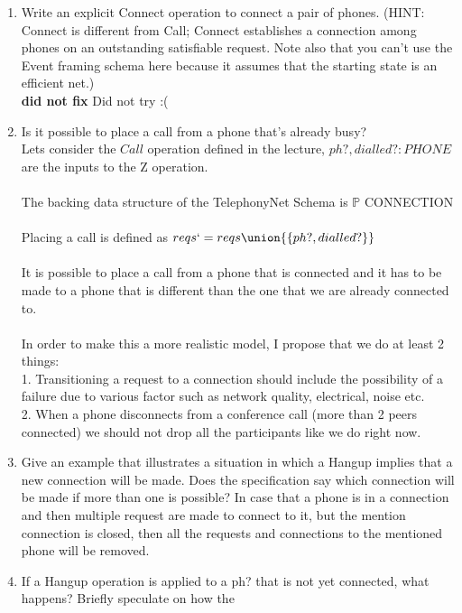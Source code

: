\documentclass{article}
\begin{document}
\begin{enumerate}
\begin{enumerate}
\item Write an explicit Connect operation to connect a pair of
phones. (HINT: Connect is different from Call; Connect establishes
a connection among phones on an outstanding satisfiable request. Note also that you can't use the Event framing schema here because it assumes that the starting state is an efficient net.) \\
\color{blue}
 \textbf{did not fix}
Did not try :(
\color{black}
\item Is it possible to place a call from a phone that's already
  busy?
  \color{blue}
  \\
  Lets consider the $Call$ operation defined in the lecture, $ph?, dialled? : PHONE$ are the inputs to the Z operation. \\
  \\
  The backing data structure of the TelephonyNet Schema is $\mathbb{P}$ CONNECTION \\
  \\
  Placing a call is defined as $reqs`= reqs \union \{\{ ph?,dialled? \}\} $ \\
  \\
  It is possible to place a call from a phone that is connected and it has to be made to a phone that is different than the one that we are already connected to. \\
  \\
  In order to make this a more realistic model, I propose that we do at least 2 things: \\
  1. Transitioning a request to a connection should include the possibility of a failure due to various factor such as network quality, electrical, noise etc. \\
  2. When a phone disconnects from a conference call (more than 2 peers connected) we should not drop all the participants like we do right now. \\
  \color{black}
\item Give an example that illustrates a situation in which a
Hangup implies that a new connection will be made. Does the
specification say which connection will be made if more than one
is possible?
\color{blue}
In case that a phone is in a connection and then multiple request are made to connect to it, but the mention connection is closed, then all the requests and connections to the mentioned phone will be removed.\\
\color{black}
\item If a Hangup operation is applied to a ph? that is not yet
connected, what happens? Briefly speculate on how the

\end{enumerate}
\end{enumerate}
\end{document}
